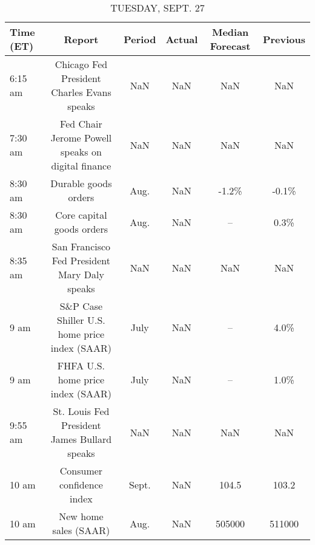 \documentclass{article}%
\begin{document}
\begin{table}[htbp]%
\caption{TUESDAY, SEPT. 27}%
\centering%
\begin{adjustbox}{width=1\textwidth}%
\begin{tabular}{lccccc}
\toprule
Time (ET) &                                            Report & Period & Actual & Median Forecast & Previous \\
\midrule
  6:15 am &        Chicago Fed President Charles Evans speaks &    NaN &    NaN &             NaN &      NaN \\
  7:30 am & Fed Chair Jerome Powell speaks on digital finance &    NaN &    NaN &             NaN &      NaN \\
  8:30 am &                              Durable goods orders &   Aug. &    NaN &           -1.2\% &    -0.1\% \\
  8:30 am &                         Core capital goods orders &   Aug. &    NaN &              -- &     0.3\% \\
  8:35 am &      San Francisco Fed President Mary Daly speaks &    NaN &    NaN &             NaN &      NaN \\
     9 am &     S\&P Case Shiller U.S. home price index (SAAR) &   July &    NaN &              -- &     4.0\% \\
     9 am &                 FHFA U.S. home price index (SAAR) &   July &    NaN &              -- &     1.0\% \\
  9:55 am &      St. Louis Fed President James Bullard speaks &    NaN &    NaN &             NaN &      NaN \\
    10 am &                         Consumer confidence index &  Sept. &    NaN &           104.5 &    103.2 \\
    10 am &                             New home sales (SAAR) &   Aug. &    NaN &          505000 &   511000 \\
\bottomrule
\end{tabular}
%
\end{adjustbox}%
\end{table}

%
\end{document}
